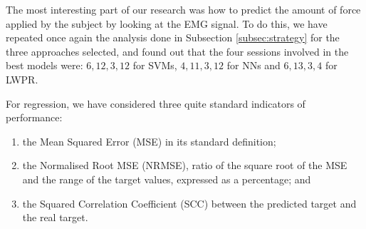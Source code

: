 The most interesting part of our research was how to predict the
amount of force applied by the subject by looking at the EMG
signal. To do this, we have repeated once again the analysis done in
Subsection \ref{subsec:strategy} for the three approaches selected,
and found out that the four sessions involved in the best models were:
$6,12,3,12$ for SVMs, $4,11,3,12$ for NNs and $6,13,3,4$ for LWPR.

For regression, we have considered three quite standard indicators of
performance:

\begin{enumerate}

  \item the Mean Squared Error (MSE) in its standard definition;

  \item the Normalised Root MSE (NRMSE), ratio of the square root of
    the MSE and the range of the target values, expressed as a
    percentage; and

  \item the Squared Correlation Coefficient (SCC) between the
    predicted target and the real target.

\end{enumerate}

